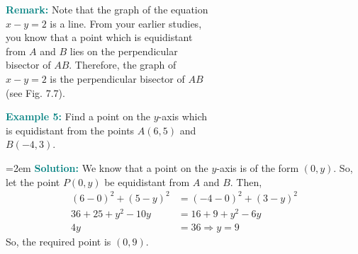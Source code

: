 \documentclass[12pt]{article}
\begin{document}
\vspace{1em}
\noindent\textcolor{teal}{\textbf{Remark:}} Note that the graph of the equation\\
$x - y = 2$ is a line. From your earlier studies,\\
you know that a point which is equidistant\\
from $A$ and $B$ lies on the perpendicular\\
bisector of $AB$. Therefore, the graph of\\
$x - y = 2$ is the perpendicular bisector of $AB$\\
(see Fig. 7.7).

\vspace{2em}

\noindent\textcolor{teal}{\large\textbf{Example 5:}} Find a point on the $y$-axis which \\
is equidistant from the points $A(6, 5)$ and \\
$B(-4, 3)$.

\vspace{1em}
{\hangindent=2em
\noindent\textcolor{teal}{\textbf{Solution:}} We know that a point on the $y$-axis is of the form $(0, y)$. So, let the point $P(0, y)$ be equidistant from $A$ and $B$. Then,
\begin{align*}
(6 - 0)^2 + (5 - y)^2 &= (-4 - 0)^2 + (3 - y)^2 \\
36 + 25 + y^2 - 10y &= 16 + 9 + y^2 - 6y \\
4y &= 36 \Rightarrow y = 9
\end{align*}
So, the required point is $(0, 9)$.
}
\end{document}
